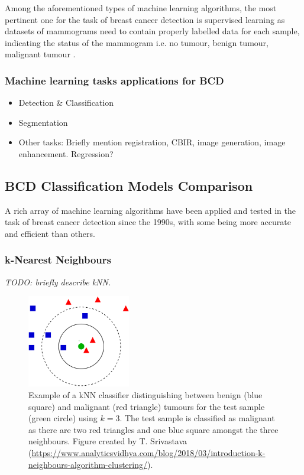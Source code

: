 Among the aforementioned types of machine learning algorithms, the most pertinent one for the task of breast cancer detection is supervised learning as datasets of mammograms need to contain properly labelled data for each sample, indicating the status of the mammogram i.e. no tumour, benign tumour, malignant tumour \cite{Shen2017}.

\subsubsection{Machine learning tasks applications for BCD}

\begin{itemize}
    \item Detection \& Classification
    \item Segmentation
    \item Other tasks: Briefly mention registration, CBIR, image generation, image enhancement. Regression?
\end{itemize}

\subsection{BCD Classification Models Comparison}

A rich array of machine learning algorithms have been applied and tested in the task of breast cancer detection since the 1990s, with some being more accurate and efficient than others.

\subsubsection{k-Nearest Neighbours}
\label{sec:litreview-knn}

\textit{TODO: briefly describe kNN.}

\begin{figure}[ht]
\centerline{\includegraphics[width=0.4\textwidth]{Dissertation/figures/litsurvey/knn.png}}
\caption{\label{fig:litsurvey-knn-example}Example of a kNN classifier distinguishing between benign (blue square) and malignant (red triangle) tumours for the test sample (green circle) using $k=3$. The test sample is classified as malignant as there are two red triangles and one blue square amongst the three neighbours. Figure created by T. Srivastava (\url{https://www.analyticsvidhya.com/blog/2018/03/introduction-k-neighbours-algorithm-clustering/}).}
\end{figure}

